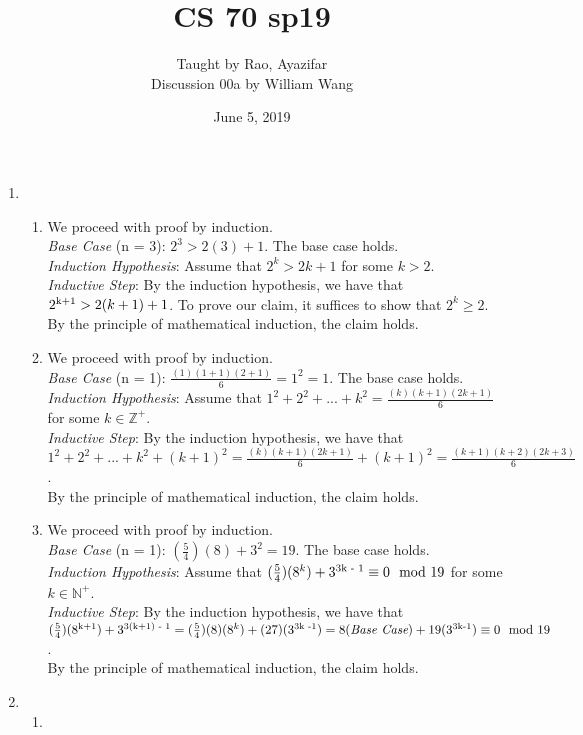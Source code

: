 \documentclass[a4paper]{article}
\title{\textbf{CS 70 sp19}}
\author{\large Taught by Rao, Ayazifar\\
Discussion 00a by William Wang}
\date{June 5, 2019}
\newcommand{\Z}{\mathbb{Z}}
\newcommand{\N}{\mathbb{N}}
\newcommand{\<}{\langle}
\renewcommand{\>}{\rangle}
\renewcommand{\^}{\wedge}
\begin{document}
\maketitle
\begin{enumerate}
    \item 
    \begin{enumerate}
        \item We proceed with proof by induction. \\
        \textit{Base Case} (n = 3): $2^3 > 2(3) + 1$. The base case holds.\\
        \textit{Induction Hypothesis}: Assume that $2^k > 2k + 1$ for some $k > 2$.\\
        \textit{Inductive Step}: By the induction hypothesis, we have that \\$2\textsuperscript{k+1} > 2(k+1) + 1$. To prove our claim, it suffices to show that $2^k \geq 2$.\\
        By the principle of mathematical induction, the claim holds.
        \item We proceed with proof by induction.\\
        \textit{Base Case} (n = 1): $\frac{(1)(1+1)(2+1)}{6} = 1^2 = 1$. The base case holds.\\
        \textit{Induction Hypothesis}: Assume that $1^2 + 2^2 + ... + k^2 = \frac{(k)(k+1)(2k+1)}{6}$ for some $k \in \Z^+$.\\
        \textit{Inductive Step}: By the induction hypothesis, we have that $1^2 + 2^2 + ... + k^2 + (k+1)^2 = \frac{(k)(k+1)(2k+1)}{6} + (k+1)^2 = \frac{(k+1)(k+2)(2k+3)}{6}$.\\
        By the principle of mathematical induction, the claim holds.
        \item We proceed with proof by induction.\\
        \textit{Base Case} (n = 1): $(\frac{5}{4})(8) + 3^2 = 19$. The base case holds.\\
        \textit{Induction Hypothesis}: Assume that $(\frac{5}{4})(8^k) + 3\textsuperscript{3k - 1} \equiv 0\mod{19}$ for some $k \in \N^+$.\\
        \textit{Inductive Step}: By the induction hypothesis, we have that $(\frac{5}{4})(8\textsuperscript{k+1}) + 3\textsuperscript{3(k+1) - 1} = (\frac{5}{4})(8)(8^k) + (27)(3\textsuperscript{3k -1}) = 8(\textit{Base Case}) + 19(3\textsuperscript{3k-1}) \equiv 0\mod{19}$.\\ 
        By the principle of mathematical induction, the claim holds. 
    \end{enumerate}
    \item
    \begin{enumerate}
        \item 
    \end{enumerate}
\end{enumerate}
\newpage
\end{document}
